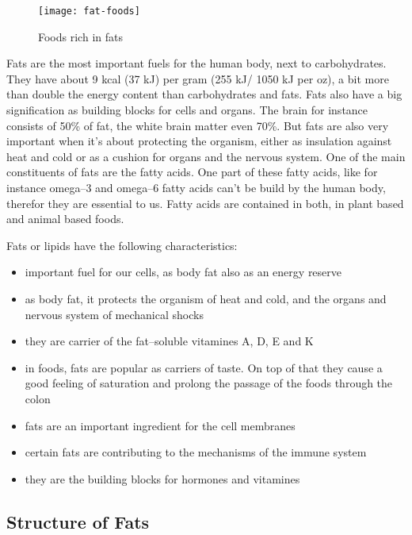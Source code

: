 \documentclass[../main.tex]{subfiles}
\begin{document}
\begin{figure}[htb!]
\centering
  \texttt{[image: fat-foods]}
  \caption{Foods rich in fats~\cite{FatFoods}}
\end{figure}

Fats are the most important fuels for the human body, next to carbohydrates.
They have about 9 kcal (37 kJ) per gram (255 kJ/ 1050 kJ per oz), a bit more than double the energy content than carbohydrates and fats.
Fats also have a big signification as building blocks for cells and organs.
The brain for instance consists of 50\% of fat, the white brain matter even 70\%.
But fats are also very important when it's about protecting the organism,
either as insulation against heat and cold or as a cushion for organs and the nervous system.
One of the main constituents of fats are the fatty acids.
One part of these fatty acids, like for instance omega--3 and omega--6 fatty acids
can't be build by the human body, therefor they are essential to us.
Fatty acids are contained in both, in plant based and animal based foods.

Fats or lipids have the following characteristics:
\begin{itemize}
\item important fuel for our cells, as body fat also as an energy reserve
\item as body fat, it protects the organism of heat and cold, and the organs and nervous system of mechanical shocks
\item they are carrier of the fat--soluble vitamines A, D, E and K
\item in foods, fats are popular as carriers of taste. On top of that
  they cause a good feeling of saturation and prolong the passage of the foods through the colon
\item fats are an important ingredient for the cell membranes
\item certain fats are contributing to the mechanisms of the immune system
\item they are the building blocks for hormones and vitamines 
\end{itemize}

\subsection{Structure of Fats}
\end{document}
